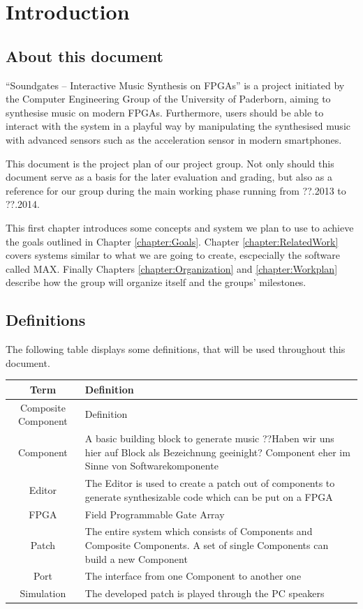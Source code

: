 \chapter{Introduction}
	\label{chapter:Introduction}
	\section{About this document}
	
"`Soundgates – Interactive Music Synthesis on FPGAs"' is a project initiated by the Computer Engineering Group of the University of Paderborn, aiming to synthesise music on modern FPGAs. 
Furthermore, users should be able to interact with the system in a playful way by manipulating the synthesised music with advanced sensors such as the acceleration sensor in modern smartphones.


This document is the project plan of our project group.
Not only should this document serve as a basis for the later evaluation and grading, 
but also as a reference for our group during the main working phase running from ??.2013 to ??.2014.

This first chapter introduces some concepts and system we plan to use to achieve the goals outlined in Chapter \ref{chapter:Goals}. 
Chapter \ref{chapter:RelatedWork} covers systems similar to what we are going to create, escpecially the software called MAX.	
Finally Chapters \ref{chapter:Organization} and \ref{chapter:Workplan} describe how the group will organize itself and the groups' milestones.

	\section{Definitions}
	 The following table displays some definitions, that will be used throughout this document.\\
	
	 \begin{tabular}[h]{|c|p{9.75cm}|}
	  \hline
	  Term & Definition \\
	  \hline
	  \hline
	  Composite Component & Definition \\\hline
	  Component & A basic building block to generate music ??Haben wir uns hier auf Block als Bezeichnung geeinight? Component eher im Sinne von Softwarekomponente\\\hline
	  Editor & The Editor is used to create a patch out of components to generate synthesizable code which can be put on a FPGA \\\hline
	  FPGA & Field Programmable Gate Array \\\hline
	  Patch & The entire system which consists of Components and Composite Components. A set of single Components can build a new Component \\\hline
	  Port & The interface from one Component to another one \\\hline
	  Simulation & The developed patch is played through the PC speakers \\\hline
	 \end{tabular}
	 


